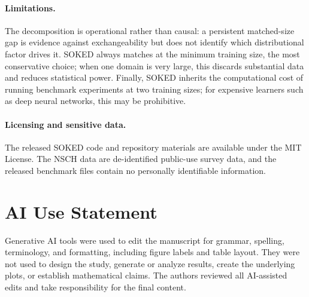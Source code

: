 \documentclass[twoside]{article}
\newtheorem{proposition}{Proposition}
\begin{document}
\paragraph{Limitations.}
The decomposition is operational rather than causal: a persistent matched-size gap is evidence against exchangeability but does not identify which distributional factor drives it.
SOKED always matches at the minimum training size, the most conservative choice; when one domain is very large, this discards substantial data and reduces statistical power.
Finally, SOKED inherits the computational cost of running benchmark experiments at two training sizes; for expensive learners such as deep neural networks, this may be prohibitive.

\paragraph{Licensing and sensitive data.}
The released SOKED code and repository materials are available under the MIT License.
The NSCH data are de-identified public-use survey data, and the released benchmark files contain no personally identifiable information.

\section*{AI Use Statement}
Generative AI tools were used to edit the manuscript for grammar, spelling, terminology, and formatting, including figure labels and table layout.
They were not used to design the study, generate or analyze results, create the underlying plots, or establish mathematical claims.
The authors reviewed all AI-assisted edits and take responsibility for the final content.




\end{document}
